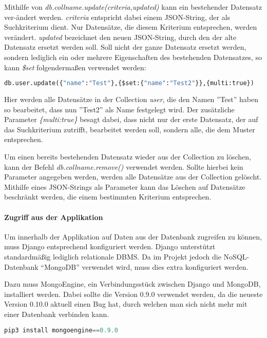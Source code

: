 \newpage

Mithilfe von \textit{db.collname.update(criteria,updated)} kann ein bestehender Datensatz ver-ändert werden. \textit{criteria} entspricht dabei einem JSON-String, der als Suchkriterium dient. Nur Datensätze, die diesem Kriterium entsprechen, werden verändert. \textit{updated} bezeichnet den neuen JSON-String, durch den der alte Datensatz ersetzt werden soll. Soll nicht der ganze Datensatz ersetzt werden, sondern lediglich ein oder mehrere Eigenschaften des bestehenden Datensatzes, so kann \textit{\$set} folgendermaßen verwendet werden:\\
\begin{lstlisting}[caption=Bearbeiten eines bestehenden Datensatzes, language=Python]
db.user.update({"name":"Test"},{$set:{"name":"Test2"}},{multi:true})
\end{lstlisting}
Hier werden alle Datensätze in der Collection \textit{user}, die den Namen ''Test'' haben so bearbeitet, dass nun ''Test2'' als Name festgelegt wird. Der zusätzliche Parameter \textit{\{multi:true\}} besagt dabei, dass nicht nur der erste Datensatz, der auf das Suchkriterium zutrifft, bearbeitet werden soll, sondern alle, die dem Muster entsprechen.

Um einen bereits bestehenden Datensatz wieder aus der Collection zu löschen, kann der Befehl \textit{db.collname.remove()} verwendet werden. Sollte hierbei kein Parameter angegeben werden, werden alle Datensätze aus der Collection gelöscht. Mithilfe eines JSON-Strings als Parameter kann das Löschen auf Datensätze beschränkt werden, die einem bestimmten Kriterium entsprechen.

\paragraph{Zugriff aus der Applikation}
\label{sec:applikation}
Um innerhalb der Applikation auf Daten aus der Datenbank zugreifen zu können, muss Django entsprechend konfiguriert werden. Django unterstützt standardmäßig lediglich relationale DBMS. Da im Projekt jedoch die NoSQL-Datenbank “MongoDB” verwendet wird, muss dies extra konfiguriert werden.

Dazu muss MongoEngine, ein Verbindungsstück zwischen Django und MongoDB, installiert werden. Dabei sollte die Version 0.9.0 verwendet werden, da die neueste Version 0.10.0 aktuell einen Bug hat, durch welchen man sich nicht mehr mit einer Datenbank verbinden kann.\\
\begin{lstlisting}[caption=Installation von MongoEngine, language=Python]
pip3 install mongoengine==0.9.0
\end{lstlisting}

